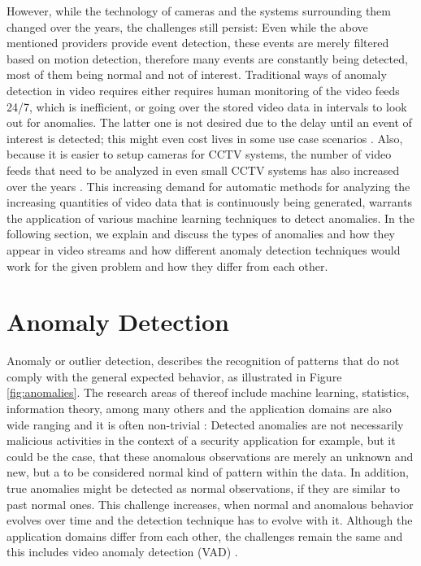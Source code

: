 However, while the technology of cameras and the systems surrounding them changed over the years, the challenges still persist: Even while the above mentioned providers provide event detection, these events are merely filtered based on motion detection, therefore many events are constantly being detected, most of them being normal and not of interest. Traditional ways of anomaly detection in video requires either requires human monitoring of the video feeds 24/7, which is inefficient, or going over the stored video data in intervals to look out for anomalies. The latter one is not desired due to the delay until an event of interest is detected; this might even cost lives in some use case scenarios \cite{ferenbok2013hidden}. Also, because it is easier to setup cameras for CCTV systems, the number of video feeds that need to be analyzed in even small CCTV systems has also increased over the years \cite{vlahos2009surveillance}.  This increasing demand for automatic methods for analyzing the increasing quantities of video data that is continuously being generated, warrants the application of various machine learning techniques to detect anomalies. In the following section, we explain and discuss the types of anomalies and how they appear in video streams and how different anomaly detection techniques would work for the given problem and how they differ from each other.



\section{Anomaly Detection} \label{sec:anomaly_detection}

Anomaly or outlier detection, describes the recognition of patterns that do not comply with the general expected behavior, as illustrated in Figure \ref{fig:anomalies}. The research areas of thereof include machine learning, statistics, information theory, among many others and the application domains are also wide ranging and it is often non-trivial \cite{chandola2009anomaly}: Detected anomalies are not necessarily malicious activities in the context of a security application for example, but it could be the case, that these anomalous observations are merely an unknown and new, but a to be considered normal kind of pattern within the data. In addition, true anomalies might be detected as normal observations, if they are similar to past normal ones. This challenge increases, when normal and anomalous behavior evolves over time and the detection technique has to evolve with it. Although the application domains differ from each other, the challenges remain the same and this includes video anomaly detection (VAD) \cite{shin20203d}.

